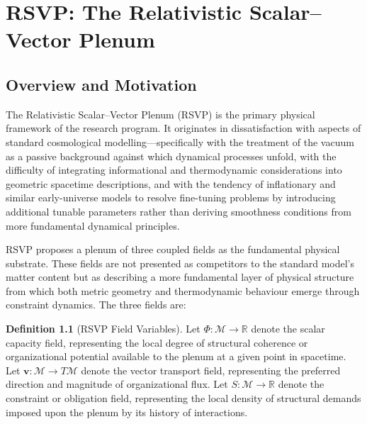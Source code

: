 \documentclass[11pt, oneside]{book}
\theoremstyle{definition}
\newtheorem{definition}{Definition}[chapter]
\theoremstyle{remark}
\begin{document}
\chapter{RSVP: The Relativistic Scalar–Vector Plenum}

\section{Overview and Motivation}

The Relativistic Scalar–Vector Plenum (RSVP) is the primary physical framework of the research program. It originates in dissatisfaction with aspects of standard cosmological modelling—specifically with the treatment of the vacuum as a passive background against which dynamical processes unfold, with the difficulty of integrating informational and thermodynamic considerations into geometric spacetime descriptions, and with the tendency of inflationary and similar early-universe models to resolve fine-tuning problems by introducing additional tunable parameters rather than deriving smoothness conditions from more fundamental dynamical principles.

RSVP proposes a plenum of three coupled fields as the fundamental physical substrate. These fields are not presented as competitors to the standard model's matter content but as describing a more fundamental layer of physical structure from which both metric geometry and thermodynamic behaviour emerge through constraint dynamics. The three fields are:

\begin{definition}[RSVP Field Variables]
Let $\Phi : \mathcal{M} \to \mathbb{R}$ denote the scalar capacity field, representing the local degree of structural coherence or organizational potential available to the plenum at a given point in spacetime. Let $\mathbf{v} : \mathcal{M} \to T\mathcal{M}$ denote the vector transport field, representing the preferred direction and magnitude of organizational flux. Let $S : \mathcal{M} \to \mathbb{R}$ denote the constraint or obligation field, representing the local density of structural demands imposed upon the plenum by its history of interactions.
\end{definition}
\end{document}
